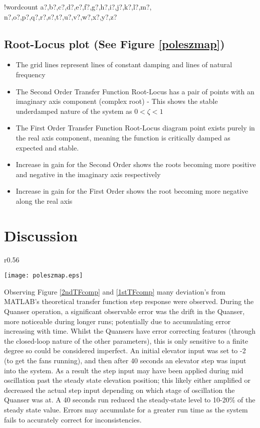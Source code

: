 \documentclass[11pt]{article}
\providecommand{\tightlist}{%
  \setlength{\itemsep}{0pt}\setlength{\parskip}{0pt}}
\newcounter{words}
\newenvironment{counted}{%
  \setcounter{words}{0}
  \SearchList!{wordcount}{\stepcounter{words}}
    {a?,b?,c?,d?,e?,f?,g?,h?,i?,j?,k?,l?,m?,
    n?,o?,p?,q?,r?,s?,t?,u?,v?,w?,x?,y?,z?}
  \UndoBoundary{'}
  \SearchOrder{p;}}{%
  \StopSearching}
\begin{document}
\begin{counted}
\subsection{\texorpdfstring{Root-Locus plot (See Figure
\ref{poleszmap})}{Root-Locus plot (See Figure )}}\label{root-locus-plot-see-figure}

\begin{itemize}
\tightlist
\item
  The grid lines represent lines of constant damping and lines of
  natural frequency
\item
  The Second Order Transfer Function Root-Locus has a pair of points
  with an imaginary axis component (complex root) - This shows the
  stable underdamped nature of the system as \(0<\zeta<1\)
\item
  The First Order Transfer Function Root-Locus diagram point exists
  purely in the real axis component, meaning the function is critically
  damped as expected and stable.
\item
  Increase in gain for the Second Order shows the roots becoming more
  positive and negative in the imaginary axis respectively
\item
  Increase in gain for the First Order shows the root becoming more
  negative along the real axis
\end{itemize}

\section{Discussion}\label{discussion}

\begin{wrapfigure}{r}{0.56\textwidth}
  \begin{center}
  \vspace{-40pt}
  \texttt{[image: poleszmap.eps]}
  \end{center}
  \caption{Map of the Poles, sysTF1 = First Order, sysTF2 = Second Order}
 \label{poleszmap}
  \vspace{-20pt}
\end{wrapfigure}

Observing Figure \ref{2ndTFcomp} and \ref{1stTFcomp} many deviation's
from MATLAB's theoretical transfer function step response were observed.
During the Quanser operation, a significant observable error was the
drift in the Quanser, more noticeable during longer runs; potentially
due to accumulating error increasing with time. Whilst the Quansers have
error correcting features (through the closed-loop nature of the other
parameters), this is only sensitive to a finite degree so could be
considered imperfect. An initial elevator input was set to -2 (to get
the fans running), and then after 40 seconds an elevator step was input
into the system. As a result the step input may have been applied during
mid oscillation past the steady state elevation position; this likely
either amplified or decreased the actual step input depending on which
stage of oscillation the Quanser was at. A 40 seconds run reduced the
steady-state level to 10-20\% of the steady state value. Errors may
accumulate for a greater run time as the system fails to accurately
correct for inconsistencies.


\end{counted}
\end{document}
